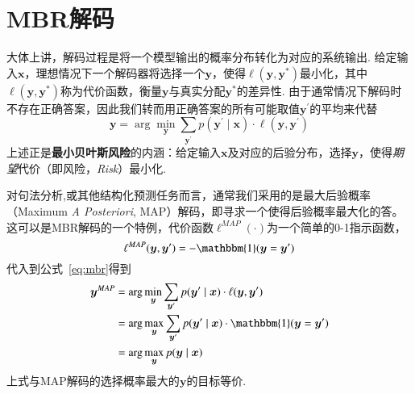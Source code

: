 \section{MBR解码}\label{sec:mbr-decoding}
大体上讲，解码过程是将一个模型输出的概率分布转化为对应的系统输出.
给定输入$\boldsymbol{x}$，理想情况下一个解码器将选择一个$\boldsymbol{y}$，使得$\ell(\boldsymbol{y},\boldsymbol{y}^{\ast})$最小化，其中$\ell(\boldsymbol{y},\boldsymbol{y}^{\ast})$称为代价函数，衡量$\boldsymbol{y}$与真实分配$\boldsymbol{y}^{\ast}$的差异性.
由于通常情况下解码时不存在正确答案，因此我们转而用正确答案的所有可能取值$\boldsymbol{y}^{\prime}$的平均来代替
\begin{equation}
    \label{eq:mbr}
    \boldsymbol{y}= \arg\min_{\boldsymbol{y}}\sum_{\boldsymbol{y}^{\prime}}p(\boldsymbol{y}^{\prime}\mid\boldsymbol{x})\cdot\ell(\boldsymbol{y},\boldsymbol{y}^{\prime})
\end{equation}
上述正是\textbf{最小贝叶斯风险}的内涵：给定输入$\boldsymbol{x}$及对应的后验分布，选择$\boldsymbol{y}$，使得\textit{期望}代价（即风险，\textit{Risk}）最小化\cite{stoyanov-eisner-2012-minimum}.

对句法分析,或其他结构化预测任务而言，通常我们采用的是最大后验概率（Maximum \textit{A Posteriori}, MAP）解码，即寻求一个使得后验概率最大化的答。
这可以是MBR解码的一个特例，代价函数$\ell^{MAP}(\cdot)$为一个简单的0-1指示函数，
\begin{equation}
    \ell^{MAP}(\boldsymbol{y},\boldsymbol{y}^{\prime}) = -\mathbbm{1}(\boldsymbol{y}=\boldsymbol{y}^{\prime})
\end{equation}
代入到公式~\ref{eq:mbr}得到
\begin{equation}
    \label{eq:map}
    \begin{split}
        \boldsymbol{y}^{MAP}&= \arg\min_{\boldsymbol{y}}\sum_{\boldsymbol{y}^{\prime}}p(\boldsymbol{y}^{\prime}\mid\boldsymbol{x})\cdot\ell(\boldsymbol{y},\boldsymbol{y}^{\prime})\\
        &=\arg\max_{\boldsymbol{y}}\sum_{\boldsymbol{y}^{\prime}}p(\boldsymbol{y}^{\prime}\mid\boldsymbol{x})\cdot\mathbbm{1}(\boldsymbol{y}=\boldsymbol{y}^{\prime})\\
        &=\arg\max_{\boldsymbol{y}}p(\boldsymbol{y}\mid\boldsymbol{x})
    \end{split}
\end{equation}
上式与MAP解码的选择概率最大的$\boldsymbol{y}$的目标等价.

